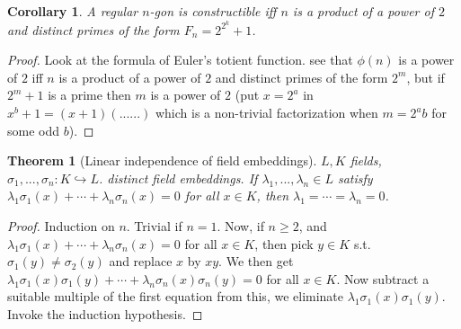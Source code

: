 \documentclass{article}
\theoremstyle{definition}
\theoremstyle{remark}
\theoremstyle{plain}
\newtheorem{thm}[defn]{Theorem}
\newtheorem{crly}[defn]{Corollary}
\begin{document}
\begin{crly}
    A regular $n$-gon is constructible iff $n$ is a product of a power of $2$ and distinct primes of the form $F_n=2^{2^k}+1$.
\end{crly}
\begin{proof}
    Look at the formula of Euler's totient function. see that $\phi(n)$ is a power of $2$ iff $n$ is a product of a power of $2$ and distinct primes of the form $2^m$, but if $2^m+1$ is a prime then $m$ is a power of $2$ (put $x=2^a$ in $x^b+1=(x+1)(......)$ which is a non-trivial factorization when $m=2^ab$ for some odd $b$).
\end{proof}
\begin{thm}[Linear independence of field embeddings] $L,K$ fields, $\sigma_1,...,\sigma_n:K\hookrightarrow L$. distinct field embeddings. If $\lambda_1,...,\lambda_n\in L$ satisfy $\lambda_1\sigma_1(x)+\cdots+\lambda_n\sigma_n(x)=0$ for all $x\in K$, then $\lambda_1=\cdots=\lambda_n=0$.
\end{thm}
\begin{proof}
    Induction on $n$. Trivial if $n=1$. Now, if $n\ge 2$, and $\lambda_1\sigma_1(x)+\cdots+\lambda_n\sigma_n(x)=0$ for all $x\in K$, then pick $y\in K$ s.t. $\sigma_1(y)\neq \sigma_2(y)$ and replace $x$ by $xy$. We then get 
    $\lambda_1\sigma_1(x)\sigma_1(y)+\cdots+\lambda_n\sigma_n(x)\sigma_n(y)=0$ for all $x\in K$. Now subtract a suitable multiple of the first equation from this, we eliminate $\lambda_1\sigma_1(x)\sigma_1(y)$. Invoke the induction hypothesis.
\end{proof}
\end{document}
